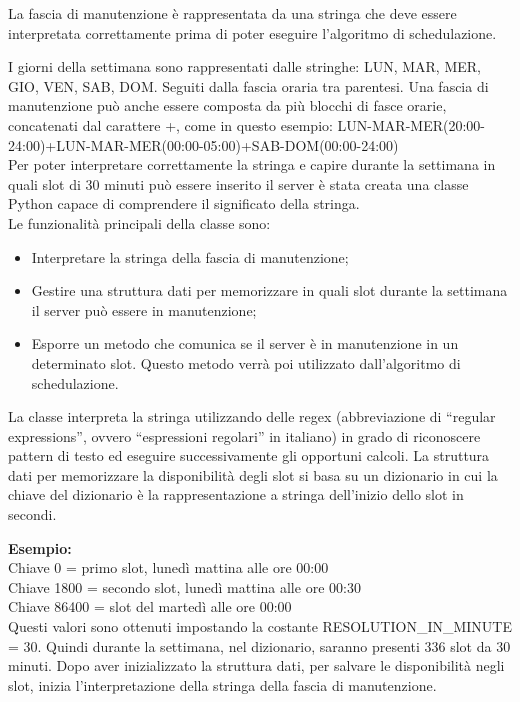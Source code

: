 La fascia di manutenzione è rappresentata da una stringa che deve essere 
interpretata correttamente prima di poter eseguire l’algoritmo di schedulazione. 

I giorni della settimana sono rappresentati dalle stringhe: 
LUN, MAR, MER, GIO, VEN, SAB, DOM. Seguiti dalla fascia oraria tra parentesi.
Una fascia di manutenzione può anche essere composta da più blocchi di fasce 
orarie, concatenati dal carattere +, come in questo esempio: 
LUN-MAR-MER(20:00-24:00)+LUN-MAR-MER(00:00-05:00)+SAB-DOM(00:00-24:00)\\

Per poter interpretare correttamente la stringa e capire durante la settimana in quali 
slot di 30 minuti può essere inserito il server è stata creata una classe 
Python capace di comprendere il significato della stringa.\\

\noindent Le funzionalità principali della classe sono:
\begin{itemize}
\item Interpretare la stringa della fascia di manutenzione;
\item Gestire una struttura dati per memorizzare in quali slot durante la 
settimana il server può essere in manutenzione;
\item Esporre un metodo che comunica se il server è in manutenzione in un 
determinato slot. Questo metodo verrà poi utilizzato dall’algoritmo di schedulazione.
\end{itemize}

La classe interpreta la stringa utilizzando delle regex (abbreviazione di 
“regular expressions”, ovvero “espressioni regolari” in italiano) in grado di 
riconoscere pattern di testo ed eseguire successivamente gli opportuni calcoli.
La struttura dati per memorizzare la disponibilità degli slot si basa su un 
dizionario in cui la chiave del dizionario è la rappresentazione a stringa 
dell’inizio dello slot in secondi.

\noindent \textbf{Esempio:}\\
Chiave 0 = primo slot, lunedì mattina alle ore 00:00\\
Chiave 1800 = secondo slot, lunedì mattina alle ore 00:30\\
Chiave 86400 = slot del martedì alle ore 00:00\\

Questi valori sono ottenuti impostando la costante RESOLUTION\_IN\_MINUTE = 30. 
Quindi durante la settimana, nel dizionario, saranno presenti 336 slot da 30 minuti.
Dopo aver inizializzato la struttura dati, per salvare le disponibilità negli 
slot, inizia l’interpretazione della stringa della fascia di manutenzione.\\

